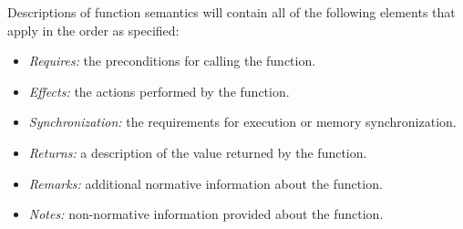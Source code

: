 \p Descriptions of function semantics will contain all of the following elements
that apply in the order as specified:

\begin{itemize}
  \item \textit{Requires:} the preconditions for calling the function.
  \item \textit{Effects:} the actions performed by the function.
  \item \textit{Synchronization:} the requirements for execution or memory
  synchronization.
  \item \textit{Returns:} a description of the value returned by the function.
  \item \textit{Remarks:} additional normative information about the function.
  \item \textit{Notes:} non-normative information provided about the function.
\end{itemize}
